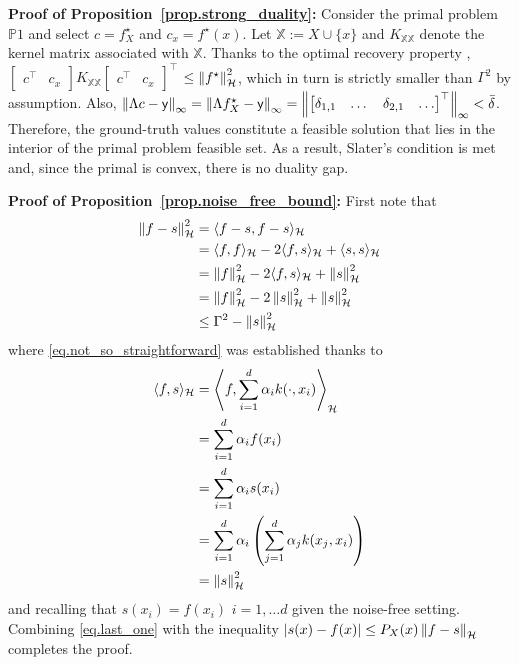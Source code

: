 \begin{my_proof}
	\textbf{Proof of Proposition~\ref{prop.strong_duality}:}
	Consider the primal problem $\mathds{P}1$ and select $c = f^\star_X$ and $c_x = f^\star(x)$. Let $\mathds{X} := X \cup \{x\}$ and $K_{\mathds{X}\mathds{X}}$ denote the kernel matrix associated with $\mathds{X}$. Thanks to the optimal recovery property \cite[Theorem 13.2]{wendland2004scattered}, $\begin{bmatrix} c^\top & c_x \end{bmatrix} K_{\mathds{X}\mathds{X}} \begin{bmatrix} c^\top & c_x \end{bmatrix}^\top$ $\leq \left\| f^\star \right\|_\mathcal{H}^2$, which in turn is strictly smaller than $\Gamma^2$ by assumption. Also, $\left\| \Lambda c - \mathsf{y} \right\|_\infty = \left\| \Lambda f^\star_X - \mathsf{y} \right\|_\infty = \left\| \begin{bmatrix} \delta_{1,1} & \dots & \delta_{2,1} & \dots \end{bmatrix}^\top \right\|_\infty < \bar \delta$. Therefore, the ground-truth values constitute a feasible solution that lies in the interior of the primal problem feasible set. As a result, Slater's condition is met and, since the primal is convex, there is no duality gap.
\end{my_proof} 

\begin{my_proof}
	\textbf{Proof of Proposition~\ref{prop.noise_free_bound}:}
	First note that 
	\begin{align}
		\left\| f-s \right\|_\mathcal{H}^2 &= \langle f-s, f-s \rangle_\mathcal{H} \\
		&= \langle f, f \rangle_\mathcal{H} - 2\langle f, s \rangle_\mathcal{H} + \langle s, s \rangle_\mathcal{H} \\
		&= \left\| f \right\|_\mathcal{H}^2 - 2\langle f, s \rangle_\mathcal{H} + \left\| s \right\|_\mathcal{H}^2 \\
		&= \left\| f \right\|_\mathcal{H}^2 - 2\left\| s \right\|_\mathcal{H}^2 + \left\| s \right\|_\mathcal{H}^2 \label{eq.not_so_straightforward}\\
		&\leq \Gamma^2 -  \left\| s \right\|_\mathcal{H}^2 \label{eq.last_one}
	\end{align}
	where \eqref{eq.not_so_straightforward} was established thanks to 
	\begin{align}
		\langle f, s \rangle_\mathcal{H} &= \left\langle f, \sum_{i=1}^d \alpha_i k(\cdot,x_i) \right\rangle_\mathcal{H} \\
		&= \sum_{i=1}^d \alpha_i f(x_i) \\
		&= \sum_{i=1}^d \alpha_i  s (x_i) \\
		&= \sum_{i=1}^d \alpha_i \left(\sum_{j=1}^d \alpha_j k(x_j,x_i) \right) \\
		&= \left\| s \right\|_\mathcal{H}^2
	\end{align}
	and recalling that $s(x_i) = f(x_i)$ $i=1,\dots d$ given the noise-free setting. Combining \eqref{eq.last_one} with the inequality $|s(x) - f(x)| \leq P_X(x) \left\| f - s \right\|_\mathcal{H}$ \cite[§11.5]{wendland2004scattered} completes the proof. 
\end{my_proof}


